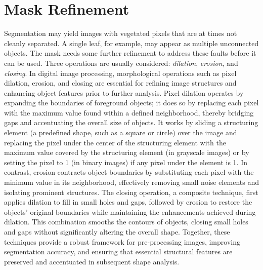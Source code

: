 \documentclass[letterpaper, notitlepage]{report}
\begin{document}
{\section{Mask Refinement}
\label{section:mask-refinement}
Segmentation may yield images with vegetated pixels that are at times not cleanly separated. A single leaf, for example, may appear as multiple unconnected objects. The mask needs some further refinement to address these faults before it can be used. Three operations are usually considered: \textit{dilation}, \textit{erosion}, and \textit{closing}. In digital image processing, morphological operations such as pixel dilation, erosion, and closing are essential for refining image structures and enhancing object features prior to further analysis. Pixel dilation operates by expanding the boundaries of foreground objects; it does so by replacing each pixel with the maximum value found within a defined neighborhood, thereby bridging gaps and accentuating the overall size of objects. It works by sliding a structuring element (a predefined shape, such as a square or circle) over the image and replacing the pixel under the center of the structuring element with the maximum value covered by the structuring element (in grayscale images) or by setting the pixel to 1 (in binary images) if any pixel under the element is 1. In contrast, erosion contracts object boundaries by substituting each pixel with the minimum value in its neighborhood, effectively removing small noise elements and isolating prominent structures. The closing operation, a composite technique, first applies dilation to fill in small holes and gaps, followed by erosion to restore the objects' original boundaries while maintaining the enhancements achieved during dilation.  This combination smooths the contours of objects, closing small holes and gaps without significantly altering the overall shape. Together, these techniques provide a robust framework for pre-processing images, improving segmentation accuracy, and ensuring that essential structural features are preserved and accentuated in subsequent shape analysis.


}
\end{document}
